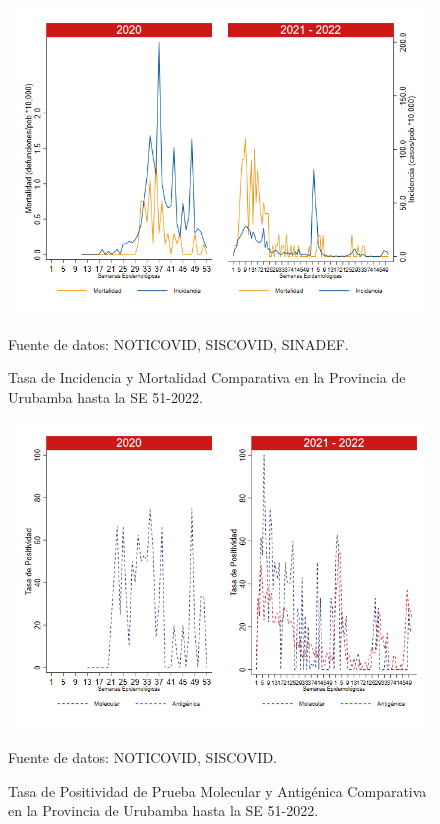 \documentclass[12pt,a4paper,openany]{book}
\begin{document}
	\begin{figure}[h]
		\caption{Tasa de Incidencia y Mortalidad Comparativa en la Provincia de Urubamba hasta la SE 51-2022.}\label{fig:inc_urub}
		\begin{center}
			\includegraphics[width=0.85\linewidth]{../figuras/incidencia_mortalidad_20_21_13.png}
		\end{center}
		{\footnotesize {Fuente de datos: NOTICOVID, SISCOVID, SINADEF.}}
	\end{figure}
	
	\begin{figure}[h]
		\caption{Tasa de Positividad de Prueba Molecular y Antigénica Comparativa en la Provincia de Urubamba hasta la SE 51-2022.}\label{fig:positividad_urub}
		\begin{center}
			\includegraphics[width=0.7\linewidth]{../figuras/positividad_20_21_13.png}
		\end{center}
		{\footnotesize {Fuente de datos: NOTICOVID, SISCOVID.}}
	\end{figure}
	
\end{document}
